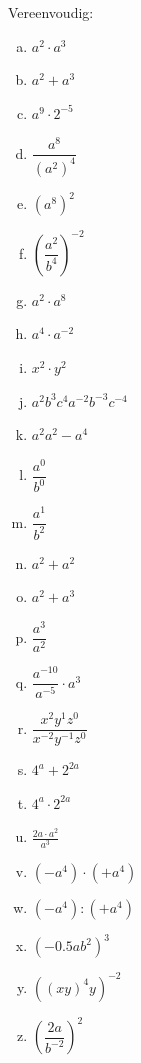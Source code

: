 \documentclass[12pt,twoside]{article}
\begin{document}
\begin{oefening}
Vereenvoudig:
\begin{multicols}{3}
  \begin{enumerate}[(a)]
  \itemsep1em
  \item $a^2\cdot a^3$
  \item $a^2+a^3$
  \item $a^9\cdot2^{-5}$
  \item $\dfrac{a^8}{\left({a^2}\right)^4}$
  \item $\left(a^8\right)^2$
  \item $\left(\dfrac{a^2}{b^4}\right)^{-2}$
  \item $a^2\cdot a^8$
  \item $a^4\cdot a^{-2}$
  \item $x^2\cdot y^2$
  \item $a^2b^3c^4a^{-2}b^{-3}c^{-4}$
  \item $a^2a^2-a^4$
  \item $\dfrac{a^0}{b^0}$
  \item $\dfrac{a^1}{b^2}$
  \item $a^2+a^2$
  \item $a^2+a^3$
  \item $\dfrac{a^3}{a^2}$
  \item $\dfrac{a^{-10}}{a^{-5}}\cdot{a^3}$
  \item $\dfrac{x^2y^1z^0}{x^{-2}y^{-1}z^{0}}$
  \item $4^a+2^{2a}$
  \item $4^a\cdot2^{2a}$
  \item $\frac{2a\cdot a^{2}}{a^{3}}$
  \item $\left(-a^4\right)\cdot\left(+a^4\right)$
  \item $\left(-a^4\right):\left(+a^4\right)$
  \item $\left(-0.5ab^2\right)^3$
  \item $\left(\left(xy\right)^4y\right)^{-2}$
  \item $\left(\dfrac{2a}{b^{-2}}\right)^2$
\end{enumerate}
\end{multicols}
\end{oefening}
\end{document}
